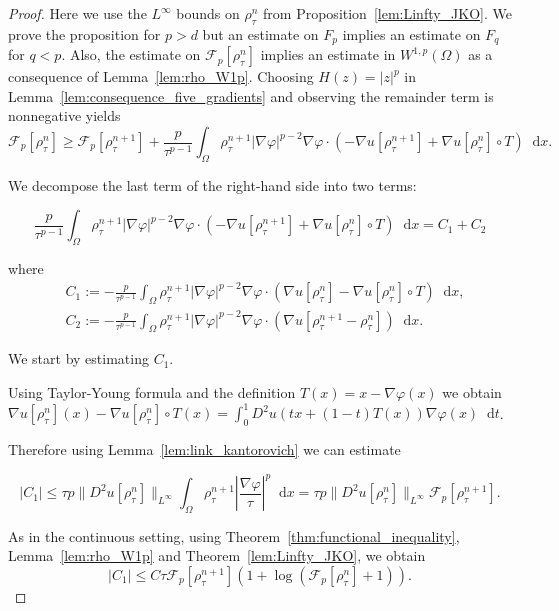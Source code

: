 \documentclass[a4paper,twosided, 11pt]{article}
\renewcommand{\color}[2][]{}
\newcommand {\f}   {\frac}
\theoremstyle{plain}
\theoremstyle{remark}
\newcommand{\diff}{\mathop{}\!\mathrm{d}}
\numberwithin{equation}{section}
\begin{document}
\begin{proof}
{\color{blue}Here we use the $L^{\infty}$ bounds on $\rho_\tau^n$ from Proposition~\ref{lem:Linfty_JKO}.} We prove the proposition for $p>d$ but an estimate on $F_p$ implies an estimate on $F_q$ for $q<p$. Also, the estimate on $\mathcal{F}_{p}[\rho^{n}_{\tau}]$ implies an estimate in $W^{1,p}(\Omega)$ as a consequence of Lemma~\ref{lem:rho_W1p}. Choosing $H(z)=|z|^p$ in Lemma~\ref{lem:consequence_five_gradients} {\color{blue} and observing the remainder term is nonnegative} yields 
$$
\mathcal{F}_{p}[\rho^{n}_{\tau}] \ge \mathcal{F}_{p}[\rho^{n+1}_{\tau}] + \f{p}{\tau^{p-1}}\int_{\Omega} \rho^{n+1}_{\tau} |\nabla\varphi|^{p-2}\nabla\varphi\cdot (-\nabla u[\rho^{n+1}_{\tau}] + \nabla u[\rho^{n}_{\tau}] \circ T)\diff x.
$$

We decompose the last term of the right-hand side into two terms:

$$
\f{p}{\tau^{p-1}}\int_{\Omega} \rho^{n+1}_{\tau} |\nabla\varphi|^{p-2}\nabla\varphi\cdot (-\nabla u[\rho^{n+1}_{\tau}] + \nabla u[\rho^{n}_{\tau}] \circ T)\diff x = C_1 + C_2
$$

where 
\begin{align*}
&C_1 := -\f{p}{\tau^{p-1}}\int_{\Omega} \rho^{n+1}_{\tau} |\nabla\varphi|^{p-2}\nabla\varphi\cdot (\nabla u[\rho^{n}_{\tau}]- \nabla u[\rho^{n}_{\tau}] \circ T)\diff x, \\
&C_2 := -\f{p}{\tau^{p-1}}\int_{\Omega} \rho^{n+1}_{\tau} |\nabla\varphi|^{p-2}\nabla\varphi\cdot (\nabla u[\rho^{n+1}_{\tau}-\rho^{n}_{\tau}])\diff x.
\end{align*}

We start by estimating $C_1$. {\color{blue}Using Taylor-Young formula and the definition $T(x) = x-\nabla\varphi(x)$ we obtain $\nabla u[\rho^{n}_{\tau}](x) - \nabla u[\rho^{n}_{\tau}] \circ T(x) =  \int_{0}^{1} D^2 u(tx + (1-t)T(x))\nabla\varphi(x)\diff t$.

Therefore using Lemma~\ref{lem:link_kantorovich} we can estimate 

$$
|C_1|\le \tau p\|D^{2}u[\rho^{n}_{\tau}]\|_{L^{\infty}}\int_{\Omega} \rho^{n+1}_{\tau} \left|\f{\nabla\varphi}{\tau}\right|^{p}\diff x =\tau p \|D^{2}u[\rho^{n}_{\tau}]\|_{L^{\infty}}\mathcal{F}_{p}[\rho^{n+1}_{\tau}].
$$
}

As in the continuous setting, using Theorem~\ref{thm:functional_inequality}, Lemma~\ref{lem:rho_W1p} and Theorem~\ref{lem:Linfty_JKO}, we obtain
$$
|C_1| \le C\tau\mathcal{F}_{p}[\rho^{n+1}_{\tau}](1+\log(\mathcal{F}_{p}[\rho^{n}_{\tau}]+1)).
$$


\end{proof}
\end{document}

